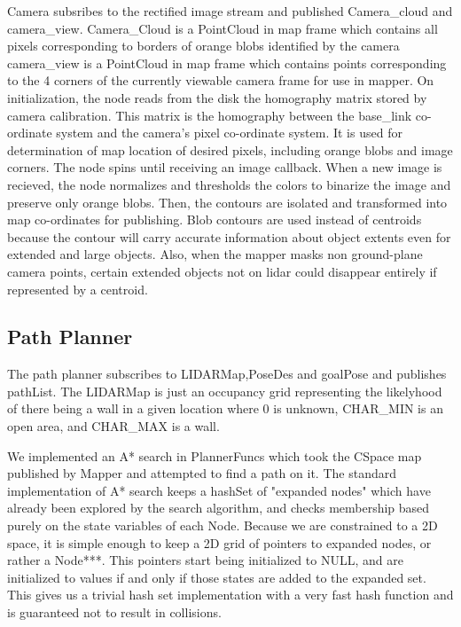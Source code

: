 \documentclass{article}
\begin{document}
Camera subsribes to the rectified image stream and published Camera_cloud and camera_view.
Camera_Cloud is a PointCloud in map frame which contains all pixels corresponding to borders of orange blobs identified by the camera
camera_view is a PointCloud in map frame which contains points corresponding to the 4 corners of the currently viewable camera frame for use in mapper.
On initialization, the node reads from the disk the homography matrix stored by camera calibration.  This matrix is the homography between the base_link co-ordinate system and the camera's pixel co-ordinate system.  It is used for determination of map location of desired pixels, including orange blobs and image corners.
The node spins until receiving an image callback.  When a new image is recieved, the node normalizes and thresholds the colors to binarize the image and preserve only orange blobs.  Then, the contours are isolated and transformed into map co-ordinates for publishing.  Blob contours are used instead of centroids because the contour will carry accurate information about object extents even for extended and large objects.  Also, when the mapper masks non ground-plane camera points, certain extended objects not on lidar could disappear entirely if represented by a centroid.

\subsection{Path Planner}

The path planner subscribes to LIDARMap,PoseDes and goalPose and publishes pathList.  
The LIDARMap is just an occupancy grid representing the likelyhood of there being a wall in a given location where 0 is unknown, CHAR_MIN is an open area, and CHAR_MAX is a wall.

We implemented an A* search in PlannerFuncs which took the CSpace map published by Mapper and attempted to find a path on it.
The standard implementation of A* search keeps a hashSet of "expanded nodes" which have already been explored by the search algorithm, and checks membership based purely on the state variables of each Node.  
Because we are constrained to a 2D space, it is simple enough to keep a 2D grid of pointers to expanded nodes, or rather a Node***. 
This pointers start being initialized to NULL, and are initialized to values if and only if those states are added to the expanded set.
This gives us a trivial hash set implementation with a very fast hash function and is guaranteed not to result in collisions.
\end{document}
